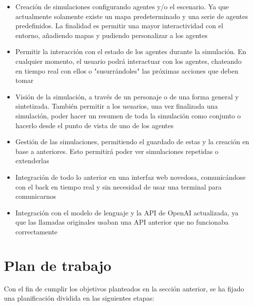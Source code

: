 \begin{itemize}
\item Creación de simulaciones configurando agentes y/o el escenario. Ya que actualmente solamente existe un mapa predeterminado y una serie de agentes predefinidos. La finalidad es permitir una mayor interactividad con el entorno, añadiendo mapas y pudiendo personalizar a los agentes

\item Permitir la interacción con el estado de los agentes durante la simulación. En cualquier momento, el usuario podrá interactuar con los agentes, chateando en tiempo real con ellos o "susurrándoles" las próximas acciones que deben tomar

\item Visión de la simulación, a través de un personaje o de una forma general y sintetizada. También permitir a los usuarios, una vez finalizada una simulación, poder hacer un resumen de toda la simulación como conjunto o hacerlo desde el punto de vista de uno de los agentes

\item Gestión de las simulaciones, permitiendo el guardado de estas y la creación en base a anteriores. Esto permitirá poder ver simulaciones repetidas o extenderlas

\item Integración de todo lo anterior en una interfaz web novedosa, comunicándose con el back en tiempo real y sin necesidad de usar una terminal para comunicarnos

\item Integración con el modelo de lenguaje y la API de OpenAI actualizada, ya que las llamadas originales usaban una API anterior que no funcionaba correctamente

\end{itemize}


\section{Plan de trabajo}
Con el fin de cumplir los objetivos planteados en la sección anterior, se ha fijado una planificación dividida en las siguientes etapas:

